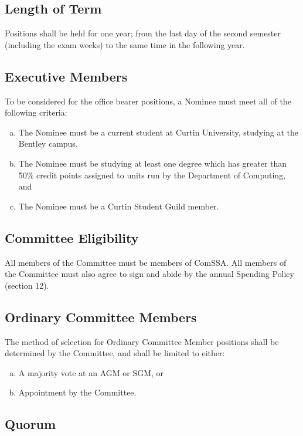 \documentclass[a4paper,12pt]{article}
\begin{document}
\subsection{Length of Term}

Positions shall be held for one year; from the last day of the second semester (including the exam weeks) to the same time in the following year.

\subsection{Executive Members}

To be considered for the office bearer positions, a Nominee must meet all of the following criteria:

\begin{enumerate}[a)]
	\item The Nominee must be a current student at Curtin University, studying at the Bentley campus,
	\item The Nominee must be studying at least one degree which has greater than 50\% credit points assigned to units run by the Department of Computing, and
	\item The Nominee must be a Curtin Student Guild member.
\end{enumerate}

\subsection{Committee Eligibility}

All members of the Committee must be members of ComSSA. All members of the Committee must also agree to sign and abide by the annual Spending Policy (section 12).

\subsection{Ordinary Committee Members}

The method of selection for Ordinary Committee Member positions shall be determined by the Committee, and shall be limited to either:

\begin{enumerate}[a)]
	\item A majority vote at an AGM or SGM, or
	\item Appointment by the Committee.
\end{enumerate}

\subsection{Quorum}
\end{document}
